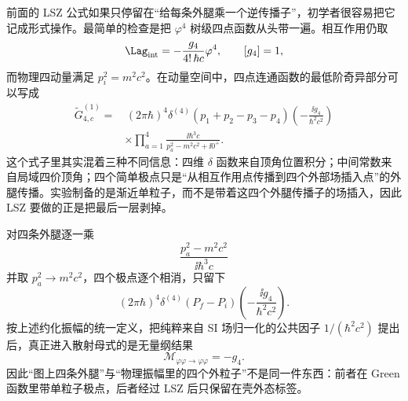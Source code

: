 
\begin{exbox}
前面的 LSZ 公式如果只停留在“给每条外腿乘一个逆传播子”，初学者很容易把它记成形式操作。最简单的检查是把 $\varphi^4$ 树级四点函数从头带一遍。相互作用仍取
\begin{equation*}
 \Lag_{\rm int}=-\frac{g_4}{4!\,\hbar c}\varphi^4,
 \qquad [g_4]=1,
\end{equation*}
而物理四动量满足 $p_i^2=m^2c^2$。在动量空间中，四点连通函数的最低阶奇异部分可以写成
\begin{equation}
 \begin{aligned}
 \widetilde G_{4,c}^{(1)}
 =&\,(2\pi\hbar)^4\delta^{(4)}(p_1+p_2-p_3-p_4)
 \left(-\frac{\ii g_4}{\hbar^2c^2}\right)\\
 &\times\prod_{a=1}^{4}
 \frac{\ii\hbar^3c}{p_a^2-m^2c^2+\ii0^+}.
 \end{aligned}
 \label{eq:phi4-fourpoint-poles-dp64}
\end{equation}
这个式子里其实混着三种不同信息：四维 $\delta$ 函数来自顶角位置积分；中间常数来自局域四价顶角；四个简单极点只是“从相互作用点传播到四个外部场插入点”的外腿传播。实验制备的是渐近单粒子，而不是带着这四个外腿传播子的场插入，因此 LSZ 要做的正是把最后一层剥掉。

对四条外腿逐一乘
\begin{equation*}
 \frac{p_a^2-m^2c^2}{\ii\hbar^3c}
\end{equation*}
并取 $p_a^2\to m^2c^2$，四个极点逐个相消，只留下
\begin{equation*}
 (2\pi\hbar)^4\delta^{(4)}(P_f-P_i)
 \left(-\frac{\ii g_4}{\hbar^2c^2}\right).
\end{equation*}
按上述约化振幅的统一定义，把纯粹来自 SI 场归一化的公共因子 $1/(\hbar^2c^2)$ 提出后，真正进入散射母式的是无量纲结果
\begin{equation}
 \boxed{\mathcal M_{\varphi\varphi\to\varphi\varphi}=-g_4.}
 \label{eq:phi4-reduced-amplitude-dp64}
\end{equation}
因此“图上四条外腿”与“物理振幅里的四个外粒子”不是同一件东西：前者在 Green 函数里带单粒子极点，后者经过 LSZ 后只保留在壳外态标签。


\end{exbox}
